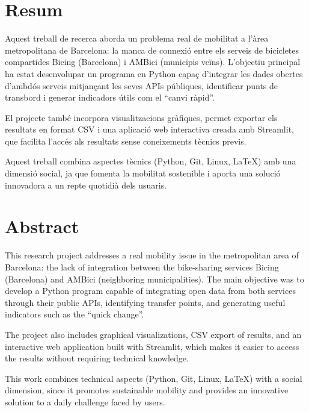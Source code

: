 \section*{Resum}
Aquest treball de recerca aborda un problema real de mobilitat a l’àrea metropolitana de Barcelona:
la manca de connexió entre els serveis de bicicletes compartides Bicing (Barcelona) i AMBici (municipis veïns).
L’objectiu principal ha estat desenvolupar un programa en Python capaç d’integrar les dades obertes d’ambdós serveis
mitjançant les seves APIs públiques, identificar punts de transbord i generar indicadors útils com el “canvi ràpid”.

El projecte també incorpora visualitzacions gràfiques, permet exportar els resultats en format CSV i una aplicació web interactiva creada amb Streamlit, que facilita l’accés als resultats sense coneixements tècnics previs.

Aquest treball combina aspectes tècnics (Python, Git, Linux, LaTeX) amb una dimensió social,
ja que fomenta la mobilitat sostenible i aporta una solució innovadora a un repte quotidià dels usuaris.

\section*{Abstract}
This research project addresses a real mobility issue in the metropolitan area of Barcelona:
the lack of integration between the bike-sharing services Bicing (Barcelona) and AMBici (neighboring municipalities).
The main objective was to develop a Python program capable of integrating open data from both services through their public APIs,
identifying transfer points, and generating useful indicators such as the “quick change”.

The project also includes graphical visualizations, CSV export of results, and an interactive web application built with Streamlit,
which makes it easier to access the results without requiring technical knowledge.

This work combines technical aspects (Python, Git, Linux, LaTeX) with a social dimension,
since it promotes sustainable mobility and provides an innovative solution to a daily challenge faced by users.
